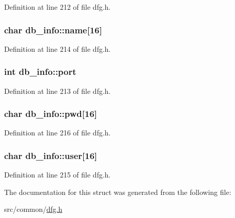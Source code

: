 Definition at line 212 of file dfg.\-h.

\hypertarget{structdb__info_a753b946bdb75a251d7c277feeddf6722}{
\subsubsection[{name}]{\setlength{\rightskip}{0pt plus 5cm}char db\-\_\-info\-::name\mbox{[}16\mbox{]}}}\label{structdb__info_a753b946bdb75a251d7c277feeddf6722}


Definition at line 214 of file dfg.\-h.

\hypertarget{structdb__info_ac425055e92c9cb6184e59126de818c25}{
\subsubsection[{port}]{\setlength{\rightskip}{0pt plus 5cm}int db\-\_\-info\-::port}}\label{structdb__info_ac425055e92c9cb6184e59126de818c25}


Definition at line 213 of file dfg.\-h.

\hypertarget{structdb__info_a498110579dc8f32bed3f6589ddc6d3cb}{
\subsubsection[{pwd}]{\setlength{\rightskip}{0pt plus 5cm}char db\-\_\-info\-::pwd\mbox{[}16\mbox{]}}}\label{structdb__info_a498110579dc8f32bed3f6589ddc6d3cb}


Definition at line 216 of file dfg.\-h.

\hypertarget{structdb__info_a7c2c04a11003ece96e0cdbf3e1e27c60}{
\subsubsection[{user}]{\setlength{\rightskip}{0pt plus 5cm}char db\-\_\-info\-::user\mbox{[}16\mbox{]}}}\label{structdb__info_a7c2c04a11003ece96e0cdbf3e1e27c60}


Definition at line 215 of file dfg.\-h.



The documentation for this struct was generated from the following file\-:\begin{DoxyCompactItemize}
\item 
src/common/\hyperlink{dfg_8h}{dfg.\-h}\end{DoxyCompactItemize}

